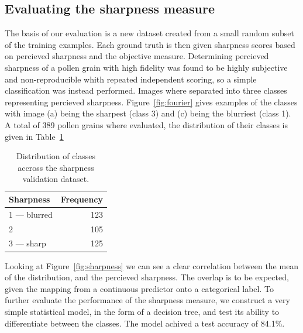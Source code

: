 \subsection{Evaluating the sharpness measure}
The basis of our evaluation is a new dataset created from a small random subset of the training examples.
Each ground truth is then given sharpness scores based on percieved sharpness and the objective measure.
Determining percieved sharpness of a pollen grain with high fidelity was found to be highly subjective and non-reproducible whith repeated independent scoring, so a simple classification was instead performed.
Images where separated into three classes representing percieved sharpness.
Figure~\ref{fig:fourier} gives examples of the classes with image (a) being the sharpest (class 3) and (c) being the blurriest (class 1).
A total of 389 pollen grains where evaluated, the distribution of their classes is given in Table~\ref{tab:sharpness}

\begin{table}[htb]
  \caption[Sharpness dataset distribution]{Distribution of classes accross the sharpness validation dataset.}\label{tab:sharpness}
  \centering 
  \begin{tabular}{lr} \toprule
    Sharpness & Frequency \\ \midrule
    1 --- blurred & 123 \\
    2 & 105 \\
    3 --- sharp & 125 \\ \bottomrule
  \end{tabular}
\end{table}

Looking at Figure~\ref{fig:sharpness} we can see a clear correlation between the mean of the distribution, and the percieved sharpness.
The overlap is to be expected, given the mapping from a continuous predictor onto a categorical label.
To further evaluate the performance of the sharpness measure, we construct a very simple statistical model, in the form of a decision tree, and test its ability to differentiate between the classes.
The model achived a test accuracy of 84.1\%.

